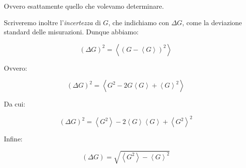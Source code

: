 Ovvero esattamente quello che volevamo determinare.

Scriveremo inoltre l'\textit{incertezza} di $G$, che indichiamo con $\Delta G$, come la deviazione standard delle misurazioni. Dunque abbiamo:

	\begin{equation}
		(\Delta G)^2 = \left \langle (G - \left \langle G \right \rangle) ^2 \right \rangle
	\end{equation}

Ovvero:

	\begin{equation}
		(\Delta G)^2 = \left \langle G^2 - 2 G \left \langle G \right \rangle + \left \langle G \right \rangle ^2 \right \rangle
	\end{equation}

Da cui:

	\begin{equation}
		(\Delta G)^2 = \left \langle G^2 \right \rangle - 2 \left \langle G \right \rangle \left \langle G \right \rangle + \left \langle G^2 \right \rangle^2
	\end{equation}

Infine:

	\begin{equation}
		(\Delta G) = \sqrt{ \left \langle G^2 \right \rangle - \left \langle G \right \rangle ^ 2 }
	\end{equation}
